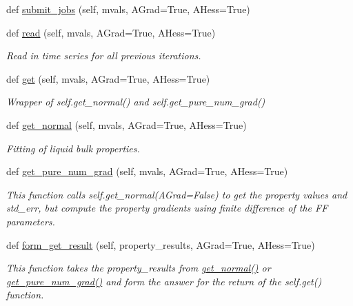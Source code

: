 \begin{DoxyCompactItemize}
\item 
def \hyperlink{classsrc_1_1liquid_1_1Liquid_adb3676bf501d6683c2a8f36b10270a82}{submit\+\_\+jobs} (self, mvals, A\+Grad=True, A\+Hess=True)
\item 
def \hyperlink{classsrc_1_1liquid_1_1Liquid_ac70bf9d77fc3969a27a5ddba3ba4eb3a}{read} (self, mvals, A\+Grad=True, A\+Hess=True)
\begin{DoxyCompactList}\small\item\em Read in time series for all previous iterations. \end{DoxyCompactList}\item 
def \hyperlink{classsrc_1_1liquid_1_1Liquid_ad55246e641f979a22458c645c362abbe}{get} (self, mvals, A\+Grad=True, A\+Hess=True)
\begin{DoxyCompactList}\small\item\em Wrapper of self.\+get\+\_\+normal() and self.\+get\+\_\+pure\+\_\+num\+\_\+grad() \end{DoxyCompactList}\item 
def \hyperlink{classsrc_1_1liquid_1_1Liquid_ae6a946b860b70f1b002acdff15fdb023}{get\+\_\+normal} (self, mvals, A\+Grad=True, A\+Hess=True)
\begin{DoxyCompactList}\small\item\em Fitting of liquid bulk properties. \end{DoxyCompactList}\item 
def \hyperlink{classsrc_1_1liquid_1_1Liquid_adec909709edf0a79148d87d97ae2fde1}{get\+\_\+pure\+\_\+num\+\_\+grad} (self, mvals, A\+Grad=True, A\+Hess=True)
\begin{DoxyCompactList}\small\item\em This function calls self.\+get\+\_\+normal(A\+Grad=False) to get the property values and std\+\_\+err, but compute the property gradients using finite difference of the FF parameters. \end{DoxyCompactList}\item 
def \hyperlink{classsrc_1_1liquid_1_1Liquid_a6c7d6b8ce3f748fba7db1d390ff6fed9}{form\+\_\+get\+\_\+result} (self, property\+\_\+results, A\+Grad=True, A\+Hess=True)
\begin{DoxyCompactList}\small\item\em This function takes the property\+\_\+results from \hyperlink{classsrc_1_1liquid_1_1Liquid_ae6a946b860b70f1b002acdff15fdb023}{get\+\_\+normal()} or \hyperlink{classsrc_1_1liquid_1_1Liquid_adec909709edf0a79148d87d97ae2fde1}{get\+\_\+pure\+\_\+num\+\_\+grad()} and form the answer for the return of the self.\+get() function. \end{DoxyCompactList}\end{DoxyCompactItemize}
